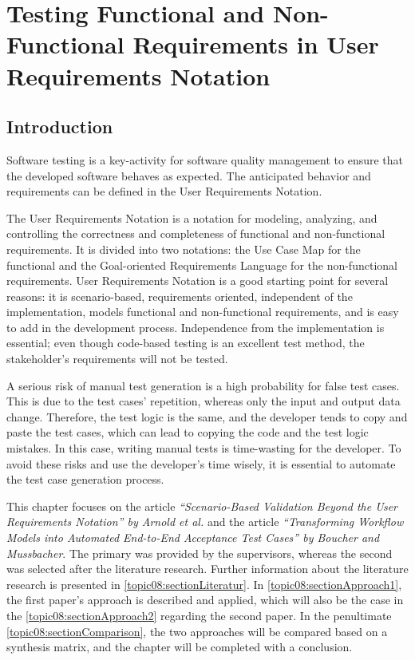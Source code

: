 
\chapter{Testing Functional and Non-Functional Requirements in User Requirements Notation}\label{sec:topic_8}


\section{Introduction}

Software testing is a key-activity for software quality management to ensure that the developed software behaves as expected. The anticipated behavior and requirements can be defined in the User Requirements Notation. 

The User Requirements Notation is a notation for modeling, analyzing, and controlling the correctness and completeness of functional and non-functional requirements. It is divided into two notations: the Use Case Map for the functional and the Goal-oriented Requirements Language for the non-functional requirements. User Requirements Notation is a good starting point for several reasons: it is scenario-based, requirements oriented, independent of the implementation, models functional and non-functional requirements, and is easy to add in the development process. Independence from the implementation is essential; even though code-based testing is an excellent test method, the stakeholder's requirements will not be tested.

A serious risk of manual test generation is a high probability for false test cases. This is due to the test cases' repetition, whereas only the input and output data change. Therefore, the test logic is the same, and the developer tends to copy and paste the test cases, which can lead to copying the code and the test logic mistakes. In this case, writing manual tests is time-wasting for the developer.  To avoid these risks and use the developer's time wisely, it is essential to automate the test case generation process.

This chapter focuses on the article \textit{\enquote{Scenario-Based Validation Beyond the User Requirements Notation} by Arnold et al.}\cite{ArnoldCorriveauShi2010} and the article \textit{\enquote{Transforming Workflow Models into Automated End-to-End Acceptance Test Cases} by Boucher and Mussbacher}\cite{BoucherMussbacher2017}. The primary was provided by the supervisors, whereas the second was selected after the literature research. Further information about the literature research is presented in \autoref{topic08:sectionLiteratur}. In \autoref{topic08:sectionApproach1}, the first paper's approach is described and applied, which will also be the case in the \autoref{topic08:sectionApproach2} regarding the second paper. In the penultimate \autoref{topic08:sectionComparison}, the two approaches will be compared based on a synthesis matrix, and the chapter will be completed with a conclusion.

